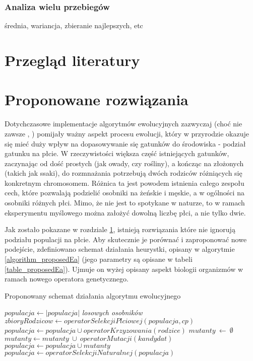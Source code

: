 \documentclass[twoside]{iisthesis}
\begin{document}
\subsection{Analiza wielu przebiegów}
średnia, wariancja, zbieranie najlepszych, etc
\chapter{Przegląd literatury} \label{chapter_literature}
\chapter{Proponowane rozwiązania} \label{chapter_proposed}

Dotychczasowe implementacje algorytmów ewolucyjnych zazwyczaj (choć nie zawsze \cite{GGA}, \cite{SexualGA}) pomijały ważny aspekt procesu ewolucji, który w przyrodzie okazuje się mieć duży wpływ na dopasowywanie się gatunków do środowiska - podział gatunku na płcie. W rzeczywistości większa część istniejących gatunków, zaczynając od dość prostych (jak owady, czy rośliny), a kończąc na złożonych (takich jak ssaki), do rozmnażania potrzebują dwóch rodziców różniących się konkretnym chromosomem. Różnica ta jest powodem istnienia całego zespołu cech, które pozwalają podzielić osobniki na żeńskie i męskie, a w ogólności na osobniki różnych płci. Mimo, że nie jest to spotykane w naturze, to w ramach eksperymentu myślowego można założyć dowolną liczbę płci, a nie tylko dwie.

Jak zostało pokazane w rozdziale \ref{chapter_literature}, istnieją rozwiązania które nie ignorują podziału populacji na płcie. Aby skutecznie je porównać i zaproponować nowe podejście, zdefiniowano schemat działania heurystki, opisany w algorytmie \ref{algorithm_proposedEa} (jego parametry są opisane w tabeli \ref{table_proposedEa}). Ujmuje on wyżej opisany aspekt biologii organizmów w ramach nowego operatora genetycznego.

\begin{algorithm}
	\caption{Proponowany schemat działania algorytmu ewolucyjnego}
	\label{algorithm_proposedEa}
	\begin{algorithmic}[1]
		\Var $populacja \gets |populacja|$ \textit{losowych osobników}
		\Var $zbioryRodzicow \gets operatorSelekcjiPlciowej(populacja, cp)$
		\State $populacja \gets populacja \cup operatorKrzyzowania(rodzice)$
		\EndFor
		\Var $mutanty\ \gets\ \emptyset$
		\State $mutanty \gets mutanty\ \cup\ operatorMutacji(kandydat)$
		\EndIf
		\EndFor
		\State $populacja \gets populacja \cup mutanty$    
		\State $populacja \gets operatorSelekcjiNaturalnej(populacja)$
		\EndWhile  
		\EndProcedure
	\end{algorithmic}
\end{algorithm}
\end{document}
